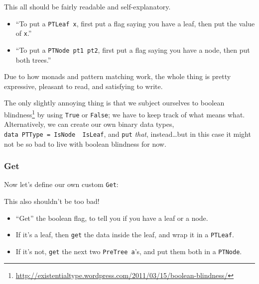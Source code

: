\documentclass[]{article}
\newenvironment{Shaded}{\begin{snugshade}}{\end{snugshade}}
\newcommand{\CommentTok}[1]{\textcolor[rgb]{0.56,0.35,0.01}{\textit{#1}}}
\newcommand{\DataTypeTok}[1]{\textcolor[rgb]{0.13,0.29,0.53}{#1}}
\newcommand{\FunctionTok}[1]{\textcolor[rgb]{0.00,0.00,0.00}{#1}}
\newcommand{\KeywordTok}[1]{\textcolor[rgb]{0.13,0.29,0.53}{\textbf{#1}}}
\newcommand{\NormalTok}[1]{#1}
\newcommand{\OtherTok}[1]{\textcolor[rgb]{0.56,0.35,0.01}{#1}}
\renewcommand{\href}[2]{#2\footnote{\url{#1}}}
\begin{document}
This all should be fairly readable and self-explanatory.

\begin{itemize}
\item
  ``To put a \texttt{PTLeaf\ x}, first put a flag saying you have a leaf, then
  put the value of \texttt{x}.''
\item
  ``To put a \texttt{PTNode\ pt1\ pt2}, first put a flag saying you have a node,
  then put both trees.''
\end{itemize}

Due to how monads and pattern matching work, the whole thing is pretty
expressive, pleasant to read, and satisfying to write.

The only slightly annoying thing is that we subject ourselves to
\href{http://existentialtype.wordpress.com/2011/03/15/boolean-blindness/}{boolean
blindness} by using \texttt{True} or \texttt{False}; we have to keep track of
what means what. Alternatively, we can create our own binary data types,
\texttt{data\ PTType\ =\ IsNode\ \textbar{}\ IsLeaf}, and \texttt{put}
\emph{that}, instead\ldots{}but in this case it might not be so bad to live with
boolean blindness for now.

\hypertarget{get}{%
\subsubsection{Get}\label{get}}

Now let's define our own custom \texttt{Get}:

\begin{Shaded}
\end{Shaded}

This also shouldn't be too bad!

\begin{itemize}
\tightlist
\item
  ``Get'' the boolean flag, to tell you if you have a leaf or a node.
\item
  If it's a leaf, then \texttt{get} the data inside the leaf, and wrap it in a
  \texttt{PTLeaf}.
\item
  If it's not, \texttt{get} the next two \texttt{PreTree\ a}'s, and put them
  both in a \texttt{PTNode}.
\end{itemize}
\end{document}
